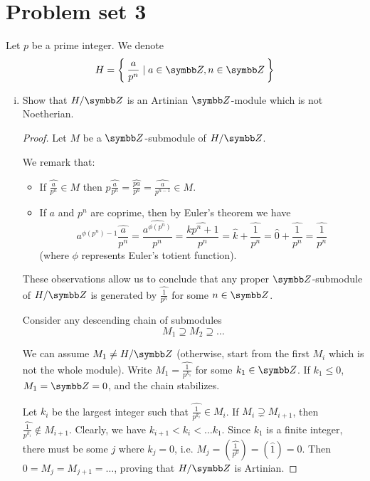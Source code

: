 \section*{Problem set 3}

\begin{problem}
Let \(p\) be a prime integer. We denote
\[
    H = \Set{ \frac{a}{p^n} \mid a \in \integers, n \in \integers }
\]
\begin{enumerate}[(i)]
    \item Show that \(H/\integers\) is an Artinian \(\integers\)-module which is not Noetherian.
    \begin{proof}
    Let \(M\) be a \(\integers\)-submodule of \(H / \integers\).
    
    We remark that:
    \begin{itemize}
        \item If \(\widehat{\frac{a}{p^n}} \in M\) then \(p \widehat{\frac{a}{p^n}} = \widehat{\frac{p a}{p^n}} = \widehat{\frac{a}{p^{n - 1}}} \in M\).
        
        \item  If \(a\) and \(p^n\) are coprime, then by Euler's theorem we have
        \[
        a^{\phi(p^n) - 1} \widehat{\frac{a}{p^n}} = \widehat{\frac{a^{\phi(p^n)}}{p^n}} = \widehat{\frac{k p^n + 1}{p^n}} = \widehat{k} + \widehat{\frac{1}{p^n}} = \widehat{0} + \widehat{\frac{1}{p^n}} = \widehat{\frac{1}{p^n}}
        \]
        (where \(\phi\) represents Euler's totient function).
    \end{itemize}
    
    These observations allow us to conclude that any proper \(\integers\)-submodule of \(H/\integers\) is generated by \(\widehat{\frac{1}{p^n}}\) for some \(n \in \integers\).
    
    Consider any descending chain of submodules
    \[M_1 \supseteq M_2 \supseteq \dots\]

    We can assume \(M_1 \neq H/\integers\) (otherwise, start from the first \(M_i\) which is not the whole module). Write \(M_1 = \widehat{\frac{1}{p^{k_1}}}\) for some \(k_1 \in \integers\). If \(k_1 \leq 0\), \(M_1 = \integers = 0\), and the chain stabilizes.
    
    Let \(k_i\) be the largest integer such that \(\widehat{\frac{1}{p^{k_i}}} \in M_i\). If \(M_i \supsetneq M_{i + 1}\), then \(\widehat{\frac{1}{p^{k_i}}} \not\in M_{i + 1}\). Clearly, we have \(k_{i + 1} < k_{i} < \dots k_1\). Since \(k_1\) is a finite integer, there must be some \(j\) where \(k_j = 0\), i.e. \(M_j = \left(\widehat{\frac{1}{p^0}}\right) = \left(\widehat{1}\right) = 0\). Then \(0 = M_j = M_{j + 1} = \dots\), proving that \(H/\integers\) is Artinian.
    

\end{proof}
\end{enumerate}
\end{problem}
